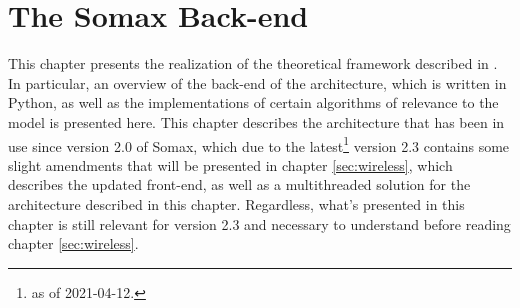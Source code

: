 \chapter{The Somax Back-end} \label{ch:implementation}
This chapter presents the realization of the theoretical framework described in \cite{somaxtheory2021}. In particular, an overview of the back-end of the architecture, which is written in Python, as well as the implementations of certain  algorithms of relevance to the model is presented here. This chapter describes the architecture that has been in use since version 2.0 of Somax, which due to the latest\footnote{as of 2021-04-12.} version 2.3 contains some slight amendments that will be presented in chapter \ref{sec:wireless}, which describes the updated front-end, as well as a multithreaded solution for the architecture described in this chapter. Regardless, what's presented in this chapter is still relevant for version 2.3 and necessary to understand before reading chapter \ref{sec:wireless}.




